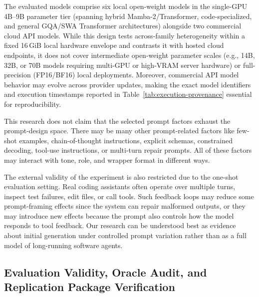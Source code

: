 \documentclass[a4paper,fleqn]{cas-sc}
\begin{document}
The evaluated models comprise six local open-weight models in the single-GPU 4B--9B parameter tier (spanning hybrid Mamba-2/Transformer, code-specialized, and general GQA/SWA Transformer architectures) alongside two commercial cloud API models. While this design tests across-family heterogeneity within a fixed 16\,GiB local hardware envelope and contrasts it with hosted cloud endpoints, it does not cover intermediate open-weight parameter scales (e.g., 14B, 32B, or 70B models requiring multi-GPU or high-VRAM server hardware) or full-precision (FP16/BF16) local deployments. Moreover, commercial API model behavior may evolve across provider updates, making the exact model identifiers and execution timestamps reported in Table~\ref{tab:execution-provenance} essential for reproducibility.

This research does not claim that the selected prompt factors exhaust the prompt-design space. There may be many other prompt-related factors like few-shot examples, chain-of-thought instructions, explicit schemas, constrained decoding, tool-use instructions, or multi-turn repair prompts. All of these factors may interact with tone, role, and wrapper format in different ways.

The external validity of the experiment is also restricted due to the one-shot evaluation setting. Real coding assistants often operate over multiple turns, inspect test failures, edit files, or call tools. Such feedback loops may reduce some prompt-framing effects since the system can repair malformed outputs, or they may introduce new effects because the prompt also controls how the model responds to tool feedback. Our research can be understood best as evidence about initial generation under controlled prompt variation rather than as a full model of long-running software agents.

\subsection{Evaluation Validity, Oracle Audit, and Replication Package Verification}\label{evaluation-validity-and-audit-evidence}
\end{document}
